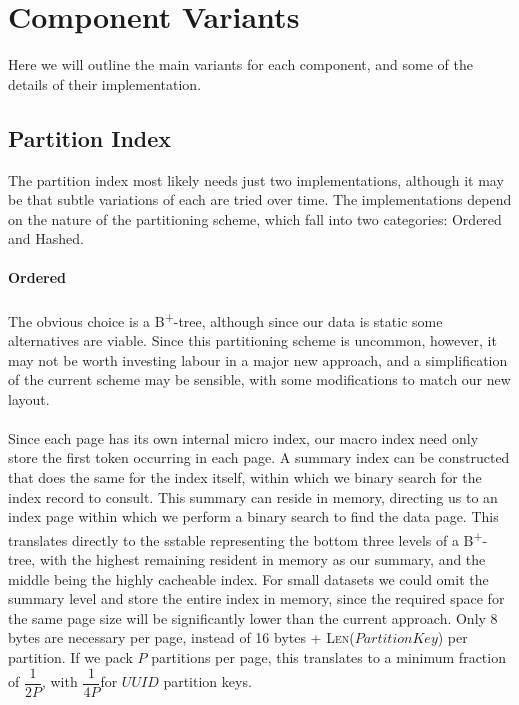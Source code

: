 \documentclass[fleqn]{article}
\begin{document}
\section{Component Variants}
Here we will outline the main variants for each component, and some of the details of their implementation.

\subsection{Partition Index}
The partition index most likely needs just two implementations, although it may be that subtle variations
of each are tried over time. The implementations depend on the nature of the partitioning scheme, which
fall into two categories: Ordered and Hashed.
\paragraph{Ordered}
\paragraph{}
    The obvious choice is a B\textsuperscript{+}-tree, although since our data is static some alternatives are viable.
    Since this partitioning scheme is uncommon, however, it may not be worth investing labour in a major new 
    approach, and a simplification of the current scheme may be sensible, with some modifications to match our
    new layout.
    \\\\
    Since each page has its own internal micro index, our macro index need only store the first token occurring 
    in each page. A summary index can be constructed that does the same for the index itself, within which
    we binary search for the index record to consult. This summary can reside in memory, directing us to an 
    index page within which we perform a binary search to find the data page. 
    This translates directly to the sstable representing the 
    bottom three levels of a B\textsuperscript{+}-tree, with the highest remaining resident in memory as our 
    summary, and the middle being the highly cacheable index. For small datasets we could omit the summary level
    and store the entire index in memory, since the required space for the same page size will be significantly 
    lower than the current approach. Only 8 bytes are necessary per page, instead of 16 bytes 
    + \textsc{Len}($PartitionKey$) per partition. If we pack $P$ partitions per page, this translates
    to a minimum fraction of \tiny$\dfrac{1}{2P}$\small, with \tiny$\dfrac{1}{4P}$\small for $UUID$ partition keys.
    
\end{document}

